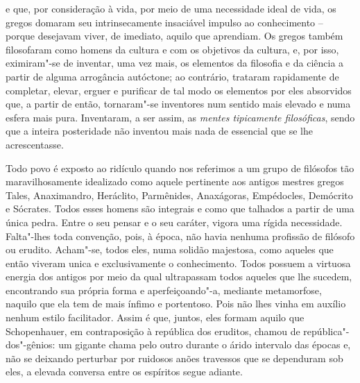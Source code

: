 e que, por consideração à vida, por meio de uma necessidade ideal de
vida, os gregos domaram seu intrinsecamente insaciável impulso ao
conhecimento -- porque desejavam viver, de imediato, aquilo que
aprendiam. Os gregos também filosofaram como homens da cultura e com os
objetivos da cultura, e, por isso, eximiram"-se de inventar, uma vez
mais, os elementos da filosofia e da ciência a partir de alguma
arrogância autóctone; ao contrário, trataram rapidamente de completar,
elevar, erguer e purificar de tal modo os elementos por eles absorvidos
que, a partir de então, tornaram"-se inventores num sentido mais elevado
e numa esfera mais pura. Inventaram, a ser assim, as \textit{mentes tipicamente filosóficas}, 
sendo que a inteira posteridade não inventou mais
nada de essencial que se lhe acrescentasse.

Todo povo é exposto ao ridículo quando nos referimos a um grupo de
filósofos tão maravilhosamente idealizado como aquele pertinente aos
antigos mestres gregos Tales, Anaximandro, Heráclito, Parmênides,
Anaxágoras, Empédocles, Demócrito e Sócrates. Todos esses homens são
integrais e como que talhados a partir de uma única pedra. Entre o seu
pensar e o seu caráter, vigora uma rígida necessidade. Falta"-lhes toda
convenção, pois, à época, não havia nenhuma profissão de filósofo ou
erudito. Acham"-se, todos eles, numa solidão majestosa, como aqueles que
então viveram unica e exclusivamente o conhecimento. Todos possuem a
virtuosa energia dos antigos por meio da qual ultrapassam todos aqueles
que lhe sucedem, encontrando sua própria forma e aperfeiçoando"-a,
mediante metamorfose, naquilo que ela tem de mais ínfimo e portentoso.
Pois não lhes vinha em auxílio nenhum estilo facilitador. Assim é que,
juntos, eles formam aquilo que Schopenhauer, em contraposição à
república dos eruditos, chamou de república"-dos"-gênios: um gigante
chama pelo outro durante o árido intervalo das épocas e, não se
deixando perturbar por ruidosos anões travessos que se dependuram sob
eles, a elevada conversa entre os espíritos segue adiante.

